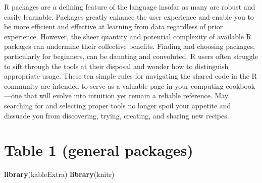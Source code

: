 \documentclass[10pt,letterpaper]{article}
\newenvironment{Shaded}{\begin{snugshade}}{\end{snugshade}}
\newcommand{\KeywordTok}[1]{\textcolor[rgb]{0.13,0.29,0.53}{\textbf{#1}}}
\newcommand{\NormalTok}[1]{#1}
\begin{document}
R packages are a defining feature of the language insofar as many are
robust and easily learnable. Packages greatly enhance the user
experience and enable you to be more efficient and effective at learning
from data regardless of prior experience. However, the sheer quantity
and potential complexity of available R packages can undermine their
collective benefits. Finding and choosing packages, particularly for
beginners, can be daunting and convoluted. R users often struggle to
sift through the tools at their disposal and wonder how to distinguish
appropriate usage. These ten simple rules for navigating the shared code
in the R community are intended to serve as a valuable page in your
computing cookbook---one that will evolve into intuition yet remain a
reliable reference. May searching for and selecting proper tools no
longer spoil your appetite and dissuade you from discovering, trying,
creating, and sharing new recipes.

\hypertarget{table-1-general-packages}{%
\section{Table 1 (general packages)}\label{table-1-general-packages}}

\begin{Shaded}
\begin{Highlighting}[]
\KeywordTok{library}\NormalTok{(kableExtra)}
\KeywordTok{library}\NormalTok{(knitr)}
\end{Highlighting}
\end{Shaded}
\end{document}

